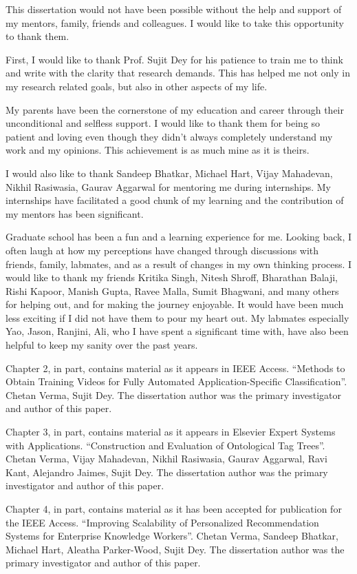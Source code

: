 \documentclass[12pt]{ucsddissertation}
\begin{document}
\begin{acknowledgements}


This dissertation would not have been possible without the help and support of my mentors, family, friends and colleagues. I would like to take this opportunity to thank them. 


First, I would like to thank Prof. Sujit Dey for his patience to train me to think and write with the clarity that research demands. This has helped me not only in my research related goals, but also in other aspects of my life. 

My parents have been the cornerstone of my education and career through their unconditional and selfless support. I would like to thank them for being so patient and loving even though they didn’t always completely understand my work and my opinions. This achievement is as much mine as it is theirs. 

I would also like to thank Sandeep Bhatkar, Michael Hart, Vijay Mahadevan, Nikhil Rasiwasia, Gaurav Aggarwal for mentoring me during internships. My internships have facilitated a good chunk of my learning and the contribution of my mentors has been significant. 

Graduate school has been a fun and a learning experience for me. Looking back, I often laugh at how my perceptions have changed through discussions with friends, family, labmates, and as a result of changes in my own thinking process. I would like to thank my friends Kritika Singh, Nitesh Shroff, Bharathan Balaji, Rishi Kapoor, Manish Gupta, Ravee Malla, Sumit Bhagwani, and many others for helping out, and for making the journey enjoyable. It would have been much less exciting if I did not have them to pour my heart out. My labmates especially Yao, Jason, Ranjini, Ali, who I have spent a significant time with, have also been helpful to keep my sanity over the past years.  


Chapter 2, in part, contains material as it appears in IEEE Access. ``Methods to Obtain Training Videos for Fully Automated Application-Specific Classification''. Chetan Verma, Sujit Dey. The dissertation author was the primary investigator and author of this paper. 

Chapter 3, in part, contains material as it appears in Elsevier Expert Systems with Applications. ``Construction and Evaluation of Ontological Tag Trees''. Chetan Verma, Vijay Mahadevan, Nikhil Rasiwasia, Gaurav Aggarwal, Ravi Kant, Alejandro Jaimes, Sujit Dey. The dissertation author was the primary investigator and author of this paper. 

Chapter 4, in part, contains material as it has been accepted for publication for the IEEE Access. ``Improving Scalability of Personalized Recommendation Systems for Enterprise Knowledge Workers''. Chetan Verma, Sandeep Bhatkar, Michael Hart, Aleatha Parker-Wood, Sujit Dey. The dissertation author was the primary investigator and author of this paper. 

\end{acknowledgements}
\end{document}

